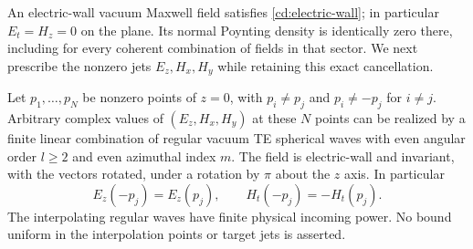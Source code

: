 An electric-wall vacuum Maxwell field satisfies
\eqref{cd:electric-wall}; in particular $E_t=H_z=0$ on the plane.
Its normal Poynting density is identically zero there, including for
every coherent combination of fields in that sector. We next prescribe
the nonzero jets $E_z,H_x,H_y$ while retaining this exact cancellation.

\begin{lemma}
\label{ct:jets}
Let $p_1,\ldots,p_N$ be nonzero points of $z=0$, with
$p_i\ne p_j$ and $p_i\ne-p_j$ for $i\ne j$. Arbitrary complex values
of $(E_z,H_x,H_y)$ at these $N$ points can be realized by a finite
linear combination of regular vacuum TE spherical waves with even
angular order $l\geq2$ and even azimuthal index $m$.
The field is electric-wall and invariant, with the vectors rotated,
under a rotation by $\pi$ about the $z$ axis. In particular
\begin{equation}\label{ct:partnerjets}
 E_z(-p_j)=E_z(p_j),\qquad H_t(-p_j)=-H_t(p_j).
\end{equation}
The interpolating regular waves have finite physical incoming power.
No bound uniform in the interpolation points or target jets is asserted.
\end{lemma}
